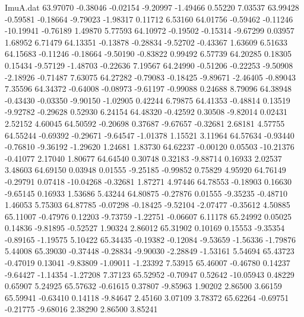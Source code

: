 \begin{filecontents}{ImuA.dat}
  63.97070   -0.38046   -0.02154   -9.20997   -1.49466    0.55220    7.03537
  63.99428   -0.59581   -0.18664   -9.79023   -1.98317    0.11712    6.53160
  64.01756   -0.59462   -0.11246  -10.19941   -0.76189    1.49870    5.77593
  64.10972   -0.19502   -0.15314   -9.67299    0.03957    1.68952    6.71479
  64.13351   -0.13878   -0.28834   -9.52702   -0.43367    1.63609    6.51633
  64.15683   -0.11246   -0.18664   -9.50190   -0.83822    0.99492    6.57739
  64.20285    0.18305    0.15434   -9.57129   -1.48703   -0.22636    7.19567
  64.24990   -0.51206   -0.22253   -9.50908   -2.18926   -0.71487    7.63075
  64.27282   -0.79083   -0.18425   -9.89671   -2.46405   -0.89043    7.35596
  64.34372   -0.64008   -0.08973   -9.61197   -0.99088    0.24688    8.79096
  64.38948   -0.43430   -0.03350   -9.90150   -1.02905    0.42244    6.79875
  64.41353   -0.48814    0.13519   -9.92782   -0.29628    0.52930    6.24154
  64.48320   -0.42592    0.30508   -9.82014    0.02431    2.52152    4.60045
  64.50592   -0.20698    0.37687   -9.67657   -0.32681    2.68181    4.57755
  64.55244   -0.69392   -0.29671   -9.64547   -1.01378    1.15521    3.11964
  64.57634   -0.93440   -0.76810   -9.36192   -1.29620    1.24681    1.83730
  64.62237   -0.00120    0.05503  -10.21376   -0.41077    2.17040    1.80677
  64.64540    0.30748    0.32183   -9.88714    0.16933    2.02537    3.48603
  64.69150    0.03948    0.01555   -9.25185   -0.99852    0.75829    4.95920
  64.76149   -0.29791    0.07418  -10.04268   -0.32681    1.87271    4.97446
  64.78553   -0.18903    0.16630   -9.65145    0.16933    1.53686    5.43244
  64.80875   -0.27876    0.01555   -9.35235   -0.48710    1.46053    5.75303
  64.87785   -0.07298   -0.18425   -9.52104   -2.07477   -0.35612    4.50885
  65.11007   -0.47976    0.12203   -9.73759   -1.22751   -0.06607    6.11178
  65.24992    0.05025    0.14836   -9.81895   -0.52527    1.90324    2.86012
  65.31902    0.10169    0.15553   -9.35354   -0.89165   -1.19575    5.10422
  65.34435   -0.19382   -0.12084   -9.53659   -1.56336   -1.79876    5.44008
  65.39030   -0.37448   -0.28834   -9.90030   -2.28849   -1.53161    5.54694
  65.43723   -0.47019    0.13041   -9.83809   -1.09011   -1.23392    7.53915
  65.46007   -0.46780    0.14237   -9.64427   -1.14354   -1.27208    7.37123
  65.52952   -0.70947    0.52642  -10.05943    0.48229    0.65907    5.24925
  65.57632   -0.61615    0.37807   -9.85963    1.90202    2.86500    3.66159
  65.59941   -0.63410    0.14118   -9.84647    2.45160    3.07109    3.78372
  65.62264   -0.69751   -0.21775   -9.68016    2.38290    2.86500    3.85241

\end{filecontents}
